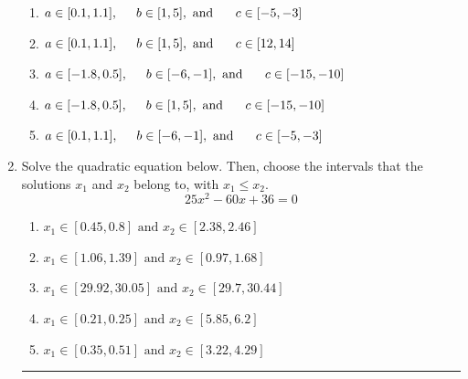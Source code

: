 \documentclass[14pt]{extbook}
\newcommand{\litem}[1]{\item#1\hspace*{-1cm}\rule{\textwidth}{0.4pt}}
\begin{document}
\begin{enumerate}
{\begin{center}
\end{center}
\begin{enumerate}[label=\Alph*.]
\item \( a \in [0.1, 1.1], \hspace*{5mm} b \in [1, 5], \text{ and } \hspace*{5mm} c \in [-5, -3] \)
\item \( a \in [0.1, 1.1], \hspace*{5mm} b \in [1, 5], \text{ and } \hspace*{5mm} c \in [12, 14] \)
\item \( a \in [-1.8, 0.5], \hspace*{5mm} b \in [-6, -1], \text{ and } \hspace*{5mm} c \in [-15, -10] \)
\item \( a \in [-1.8, 0.5], \hspace*{5mm} b \in [1, 5], \text{ and } \hspace*{5mm} c \in [-15, -10] \)
\item \( a \in [0.1, 1.1], \hspace*{5mm} b \in [-6, -1], \text{ and } \hspace*{5mm} c \in [-5, -3] \)

\end{enumerate} }
\litem{
Solve the quadratic equation below. Then, choose the intervals that the solutions $x_1$ and $x_2$ belong to, with $x_1 \leq x_2$.\[ 25x^{2} -60 x + 36 = 0 \]\begin{enumerate}[label=\Alph*.]
\item \( x_1 \in [0.45, 0.8] \text{ and } x_2 \in [2.38, 2.46] \)
\item \( x_1 \in [1.06, 1.39] \text{ and } x_2 \in [0.97, 1.68] \)
\item \( x_1 \in [29.92, 30.05] \text{ and } x_2 \in [29.7, 30.44] \)
\item \( x_1 \in [0.21, 0.25] \text{ and } x_2 \in [5.85, 6.2] \)
\item \( x_1 \in [0.35, 0.51] \text{ and } x_2 \in [3.22, 4.29] \)


\end{enumerate}}
\end{enumerate}
\end{document}
